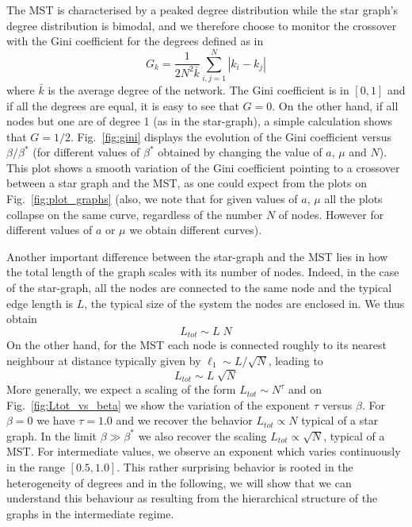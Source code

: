 The MST is characterised by a peaked degree distribution while the star graph's degree distribution is bimodal, and we therefore choose to monitor the crossover with the Gini coefficient for the degrees defined as in~\cite{Gini:1987}
\begin{equation}
\label{eq:gini}
G_k = \frac{1}{2 N^2 \bar{k}} \sum_{i,j=1}^{N} | k_i - k_j |
\end{equation}
where $\bar{k}$ is the average degree of the network. The Gini coefficient is in $[0,1]$ and if all the degrees are equal, it is easy to see that $G=0$. On the other hand, if all nodes but one are of degree 1 (as in the star-graph), a simple calculation shows that $G=1/2$. Fig.~\ref{fig:gini} displays the evolution of the Gini coefficient versus $\beta/\beta^*$ (for different values of $\beta^*$ obtained by changing the value of $a$, $\mu$ and $N$). This plot shows a smooth variation of the Gini coefficient pointing to a crossover between a star graph and the MST,  as one could expect from the plots on Fig.~\ref{fig:plot_graphs} (also, we note that for given values of $a$, $\mu$ all the plots collapse on the same curve, regardless of the number $N$ of nodes. However for different values of $a$ or $\mu$ we obtain different curves).

Another important difference between the star-graph and the MST lies in how the total length of the graph scales with its number of nodes. Indeed, in the case of the star-graph, all the nodes are connected to the same node and the typical edge length is $L$, the typical size of the system the nodes are enclosed in. We thus obtain
\begin{equation}
\label{eq:Ltot_star}
L_{tot} \sim L\; N
\end{equation}
On the other hand, for the MST each node is connected roughly to its nearest neighbour at distance typically given by $\ell_1\sim L/\sqrt{N}$, leading to
\begin{equation}
\label{eq:Ltot_MST}
L_{tot} \sim L\; \sqrt{N}
\end{equation}
More generally, we expect a scaling of the form $L_{tot}\sim N^\tau$ and on Fig.~\ref{fig:Ltot_vs_beta} we show the variation of the exponent $\tau$ versus $\beta$. For $\beta=0$ we have $\tau=1.0$ and we recover the behavior $L_{tot} \propto N$ typical of a star graph. In the limit $\beta \gg \beta^*$ we also recover the scaling $L_{tot} \propto \sqrt{N}$, typical of a MST. For intermediate values, we observe an exponent which varies continuously in the range $[0.5,1.0]$. This rather surprising behavior is rooted in the heterogeneity of degrees and in the following, we will show that we can understand this behaviour as resulting from the hierarchical structure of the graphs in the intermediate regime. 

